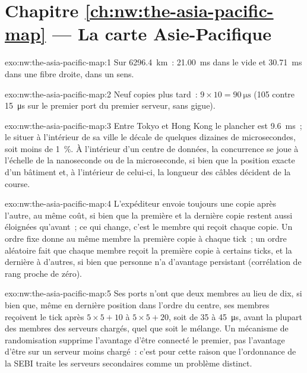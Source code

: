 \section*{Chapitre \ref{ch:nw:the-asia-pacific-map} --- La carte Asie-Pacifique}

\begin{solution}{exo:nw:the-asia-pacific-map:1}
Sur \qty{6296.4}{\kilo\metre}~: \qty{21.00}{\milli\second} dans le vide et \qty{30.71}{\milli\second} dans une fibre droite, dans un sens.
\end{solution}

\begin{solution}{exo:nw:the-asia-pacific-map:2}
Neuf copies plus tard~: $9 \times 10 = \qty{90}{\micro\second}$ (105 contre \qty{15}{\micro\second} sur le premier port du premier serveur, sans gigue).
\end{solution}

\begin{solution}{exo:nw:the-asia-pacific-map:3}
Entre Tokyo et Hong Kong le plancher est \qty{9.6}{\milli\second}~; le situer à l'intérieur de sa ville le décale de quelques dizaines de microsecondes, soit moins de 1~\%.
À l'intérieur d'un centre de données, la concurrence se joue à l'échelle de la nanoseconde ou de la microseconde, si bien que la position exacte d'un bâtiment et, à l'intérieur de celui-ci, la longueur des câbles
décident de la course.
\end{solution}

\begin{solution}{exo:nw:the-asia-pacific-map:4}
L'expéditeur envoie toujours une copie après l'autre, au même coût, si bien que la première et la dernière copie restent aussi éloignées qu'avant~; ce qui change, c'est le membre qui reçoit chaque copie.
Un ordre fixe donne au même membre la première copie à chaque tick~; un ordre aléatoire fait que chaque membre reçoit la première copie à certains ticks,
et la dernière à d'autres, si bien que personne n'a d'avantage persistant (corrélation de rang proche de zéro).
\end{solution}

\begin{solution}{exo:nw:the-asia-pacific-map:5}
Ses ports n'ont que deux membres au lieu de dix, si bien que, même en dernière position dans l'ordre du centre, ses membres reçoivent le tick après
$5 \times 5 + 10$ à $5 \times 5 + 20$, soit de 35 à \qty{45}{\micro\second}, avant la plupart des membres des serveurs chargés, quel que soit le mélange. Un
mécanisme de randomisation supprime l'avantage d'être connecté le premier, pas l'avantage d'être sur un serveur moins chargé~: c'est pour cette raison que
l'ordonnance de la SEBI traite les serveurs secondaires comme un problème distinct.
\end{solution}

